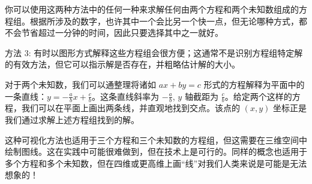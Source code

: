 你可以使用这两种方法中的任何一种来求解任何由两个方程和两个未知数组成的方程组。根据所涉及的数字，也许其中一个会比另一个快一点，但无论哪种方式，都不会节省超过一分钟的时间，因此只要选择其中之一就好。

\begin{method}{方法 3: }
    有时以图形方式解释这些方程组会很方便；这通常不是识别方程组特定解的有效方法，但它可以指示解是否存在，并粗略估计解的大小。

    对于两个未知数，我们可以通整理将诸如 $ax+by=c$ 形式的方程解释为平面中的一条直线：$y = -\frac{a}{b}x+\frac{c}{b}$。这条直线斜率为 $-\frac{a}{b}$, $y$ 轴截距为 $\frac{c}{b}$。给定两个这样的方程，我们可以在平面上画出两条线，并直观地找到交点。该点的 $(x, y)$ 坐标正是我们通过求解上述方程组找到的解。

    \begin{center}
    \end{center}

    这种可视化方法也适用于三个方程和三个未知数的方程组，但这需要在三维空间中绘制图线。这在实践中可能很难做到，但在技术上是可行的。同样的概念也适用于多个方程和多个未知数，但在四维或更高维上画``线''对我们人类来说是可能是无法想象的！
\end{method}

